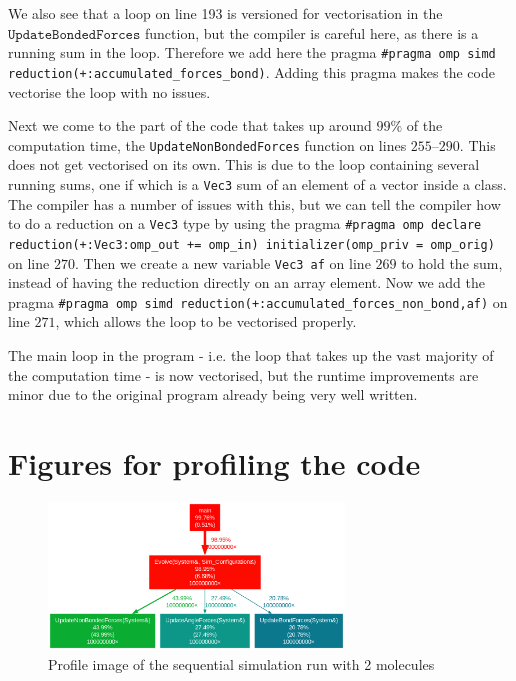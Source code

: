 \documentclass{article}
\begin{document}
We also see that a loop on line 193 is versioned for vectorisation in the $\texttt{UpdateBondedForces}$ function, but the compiler is careful here, as there is a running sum in the loop. Therefore we add here the pragma \texttt{\#pragma omp simd reduction(+:accumulated\_forces\_bond)}. Adding this pragma makes the code vectorise the loop with no issues.

Next we come to the part of the code that takes up around $99\%$ of the computation time, the \texttt{UpdateNonBondedForces} function on lines $255$--$290$. This does not get vectorised on its own. This is due to the loop containing several running sums, one if which is a \texttt{Vec3} sum of an element of a vector inside a class. The compiler has a number of issues with this, but we can tell the compiler how to do a reduction on a \texttt{Vec3} type by using the pragma \texttt{\#pragma omp declare reduction(+:Vec3:omp\_out += omp\_in) initializer(omp\_priv = omp\_orig)} on line $270$. Then we create a new variable \texttt{Vec3 af} on line $269$ to hold the sum, instead of having the reduction directly on an array element. Now we add the pragma \texttt{\#pragma omp simd reduction(+:accumulated\_forces\_non\_bond,af)} on line $271$, which allows the loop to be vectorised properly. 

The main loop in the program - i.e. the loop that takes up the vast majority of the computation time - is now vectorised, but the runtime improvements are minor due to the original program already being very well written.
\newpage
\appendix
\section*{Figures for profiling the code}
\FloatBarrier
\begin{figure}
    \includegraphics[width=0.7\textwidth]{Images/seq_2mol_profile.png
    }
    \centering
    \caption{Profile image of the sequential simulation run with 2 molecules}
    \label{fig: seq profile 2 molecule}
\end{figure}
\end{document}
